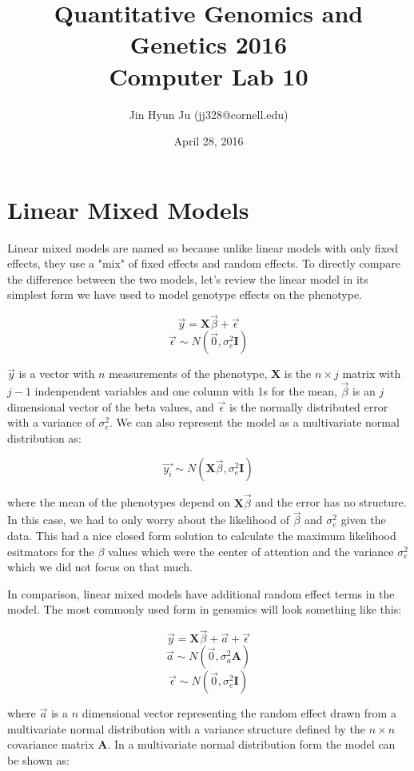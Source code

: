 \documentclass[11pt, oneside]{article}\usepackage[]{graphicx}\usepackage[]{color}
\title{Quantitative Genomics and Genetics 2016 \\ Computer Lab 10}
\author{Jin Hyun Ju (jj328@cornell.edu)}
\date{April 28, 2016}							%
\begin{document}
\maketitle


\section{Linear Mixed Models}

Linear mixed models are named so because unlike linear models with only fixed effects, they use a "mix" of fixed effects and random effects. To directly compare the difference between the two models, let's review the linear model in its simplest form we have used to model genotype effects on the phenotype.

$$ \vec{y} =  \mathbf{X}\vec{\beta} + \vec{\epsilon} $$
$$ \vec{\epsilon} \sim N(\vec{0}, \sigma_e^2 \mathbf{I}) $$

$ \vec{y}$ is a vector with $ n $ measurements of the phenotype, $ \mathbf{X} $ is the $n \times j $ matrix with $ j -1 $ indenpendent variables and one column with 1s for the mean, $ \vec{\beta} $ is an $ j $ dimensional vector of the beta values, and $ \vec{\epsilon} $ is the normally distributed error with a variance of $ \sigma_e^2 $. We can also represent the model as a multivariate normal distribution as:

$$ \vec{y_i} \sim N(\mathbf{X}\vec{\beta}, \sigma_e^2\mathbf{I}) $$

where the mean of the phenotypes depend on $ \mathbf{X}\vec{\beta} $ and the error has no structure. In this case, we had to only worry about the likelihood of $\vec{\beta}$ and $\sigma_e^2$ given the data. This had a nice closed form solution to calculate the maximum likelihood esitmators for the $\beta$ values which were the center of attention and the variance $\sigma_e^2$ which we did not focus on that much.

In comparison, linear mixed models have additional random effect terms in the model. The most commonly used form in genomics will look something like this:

$$ \vec{y} =  \mathbf{X}\vec{\beta} + \vec{a} + \vec{\epsilon}$$
$$ \vec{a} \sim N(\vec{0}, \sigma_a^2 \mathbf{A}) $$
$$ \vec{\epsilon} \sim N(\vec{0}, \sigma_e^2 \mathbf{I}) $$

where $\vec{a}$ is a $ n $ dimensional vector representing the random effect drawn from a multivariate normal distribution with a variance structure defined by the $n \times n $ covariance matrix $\mathbf{A}$. In a multivariate normal distribution form the model can be shown as:
\end{document}
